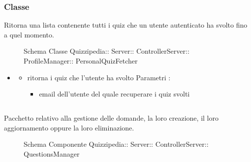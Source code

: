 \subsubsection{Classe }
Ritorna una lista contenente tutti i quiz che un utente autenticato ha svolto fino a quel momento.
\begin{figure}[H]
\centering
\noindent{}
\caption[Schema Classe PersonalQuizFetcher]{Schema Classe Quizzipedia:: Server:: ControllerServer:: ProfileManager:: PersonalQuizFetcher}
\end{figure}
\begin{itemize}
\item {}
\begin{itemize}
\item {}
\newline
ritorna i quiz che l'utente ha svolto
\newline
Parametri :
\begin{itemize}
\item {}
\newline
email dell'utente del quale recuperare i quiz svolti
\end{itemize}
\end{itemize}
\end{itemize}
\subsection{}
Pacchetto relativo alla gestione delle domande, la loro creazione, il loro aggiornamento oppure la loro eliminazione.
\begin{figure}[H]
\centering
\noindent{}
\caption[Schema Componente QuestionsManager]{Schema Componente Quizzipedia:: Server:: ControllerServer:: QuestionsManager}
\end{figure}
